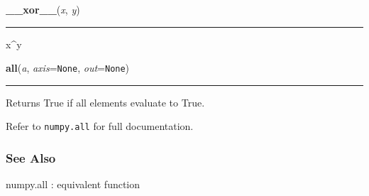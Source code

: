     \vspace{0.5ex}

    \begin{boxedminipage}{\textwidth}

    \raggedright \textbf{\_\_xor\_\_}(\textit{x}, \textit{y})

    \vspace{-1.5ex}

    \rule{\textwidth}{0.5\fboxrule}

x{\textasciicircum}y
    \vspace{1ex}

    \end{boxedminipage}

    \label{numpy:ndarray:all}

    \vspace{0.5ex}

    \begin{boxedminipage}{\textwidth}

    \raggedright \textbf{all}(\textit{a}, \textit{axis}=\texttt{None}, \textit{out}=\texttt{None})

    \vspace{-1.5ex}

    \rule{\textwidth}{0.5\fboxrule}

Returns True if all elements evaluate to True.

Refer to \texttt{numpy.all} for full documentation.



\hypertarget{see-also}{}
\subsubsection*{See Also}

numpy.all : equivalent function
    \vspace{1ex}

    \end{boxedminipage}

    \label{numpy:ndarray:any}

    \vspace{0.5ex}

